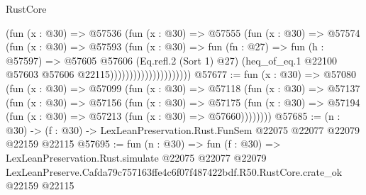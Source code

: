 \begin{lexlean}{RustCore}
\begin{coremodule}
                                  (fun (x : @30) =>
                                  @57536
                                    (fun (x : @30) =>
                                    @57555
                                      (fun (x : @30) =>
                                      @57574
                                        (fun (x : @30) =>
                                        @57593
                                          (fun (x : @30) =>
                                          fun (fn : @27) =>
                                          fun (h : @57597) =>
                                          @57605
                                            @57606
                                            (Eq.refl.{2} (Sort 1) @27)
                                            (heq_of_eq.{1}
                                              @22100
                                              @57603
                                              @57606
                                              @22115)))))))))))))))))))))
@57677 := fun (x : @30) =>
  @57080
    (fun (x : @30) =>
    @57099
      (fun (x : @30) =>
      @57118
        (fun (x : @30) =>
        @57137
          (fun (x : @30) =>
          @57156
            (fun (x : @30) =>
            @57175
              (fun (x : @30) => @57194 (fun (x : @30) => @57213 (fun (x : @30) => @57660))))))))
@57685 := (n : @30) ->
  (f : @30) -> LexLeanPreservation.Rust.FunSem @22075 @22077 @22079 @22159 @22115
@57695 := fun (n : @30) =>
  fun (f : @30) =>
  LexLeanPreservation.Rust.simulate
    @22075
    @22077
    @22079
    LexLeanPreserve.Cafda79c757163ffe4c6f07f487422bdf.R50.RustCore.crate_ok
    @22159
    @22115
\end{coremodule}
\end{lexlean}
